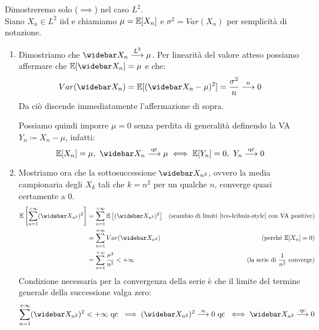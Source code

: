 \medskip
\begin{dimo}
  Dimostreremo solo ($\implies$) nel caso $L^2$. \\
  Siano $X_n \in L^2$ iid e chiamiamo $\mu = \mathbb E[X_n]$ e $\sigma^2 = Var(X_n)$ per semplicità di notazione.

  \begin{enumerate}
    \item Dimostriamo che $\widebar X_n \stackrel{L^2}{\longrightarrow} \mu$.
    Per linearità del valore atteso possiamo affermare che $\EE[\widebar X_n]=\mu$ e che:
      $$Var(\widebar X_n)= \EE[(\widebar X_n - \mu)^2] =\dfrac{\sigma^2}{n} \stackrel{n}{\longrightarrow} 0$$
      Da ciò discende immediatamente l'affermazione di sopra.

      Possiamo quindi imporre $\mu=0$ senza perdita di generalità definendo la VA $Y_n \coloneqq X_n-\mu$, infatti:
      $$\EE[X_n]=\mu, \ \widebar X_n \stackrel{\text{qc}}{\longrightarrow} \mu \iff \EE[Y_n]=0, \  Y_n \stackrel{\text{qc}}{\longrightarrow} 0$$

    \item Mostriamo ora che la sottosuccessione $\widebar X_{n^2}$, ovvero la media campionaria degli $X_k$ tali che $k=n^2$ per un qualche $n$, converge quasi certamente a 0.
      \begin{align*}
      	\EE \left[ \sum_{n=1}^{+\infty}(\widebar X_{n^2})^2 \right] &= \sum_{n=1}^{+\infty} \EE\left[ (\widebar X_{n^2})^2 \right] &\text{(scambio di limiti \ref{teo-leibniz-style} con VA positive)}\\
      	&= \sum_{n=1}^{+\infty} Var(\widebar X_{n^2}) &\text{(perché $\EE[X_n]=0$)} \\
      	&= \sum_{n=1}^{+\infty} \dfrac{\sigma^2}{n^2} < +\infty &\text{(la serie di $\frac 1{n^2}$ converge)}
      \end{align*}
      Condizione necessaria per la convergenza della serie è che il limite del termine generale della successione valga zero:
      $$\sum_{n=1}^{+\infty}( \widebar X_{n^2} )^2 < +\infty \ \text{qc} \ \implies ( \widebar X_{n^2})^2 \stackrel{n}{\longrightarrow} 0 \ \text{qc} \ \iff \widebar X_{n^2} \stackrel{\text{qc}}{\longrightarrow} 0$$


\end{enumerate}
\end{dimo}

